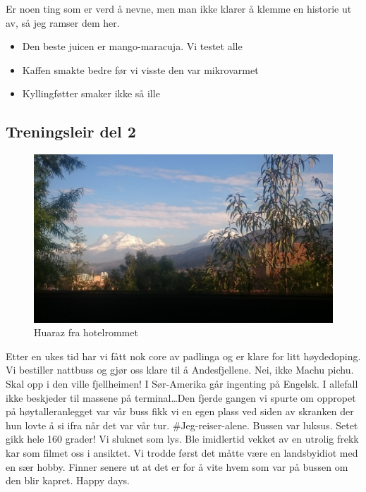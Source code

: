 Er noen ting som er verd å nevne, men man ikke klarer å klemme en
historie ut av, så jeg ramser dem her.

\begin{itemize}
	\item Den beste juicen er mango-maracuja. Vi testet
			alle
		\item Kaffen smakte bedre før vi visste den var
			mikrovarmet
		\item Kyllingføtter smaker ikke så ille
\end{itemize}


\subsection{Treningsleir del 2}

\begin{figure}[!h]
	\centering
	\includegraphics[width=\textwidth]{Hotellromhuaraz}
	\caption*{Huaraz fra hotelrommet}	
\label{fig:huaraz}
\end{figure}
Etter en ukes tid har vi fått nok core av padlinga og er klare for
litt høydedoping. Vi bestiller nattbuss og gjør oss klare til å
Andesfjellene. Nei, ikke Machu pichu. Skal opp i den ville
fjellheimen! I Sør-Amerika går ingenting på Engelsk. I allefall ikke
beskjeder til massene på terminal\ldots Den fjerde
gangen vi spurte om oppropet på høytalleranlegget var vår buss fikk vi
en egen plass ved siden av skranken der hun lovte å si ifra når det var vår
tur. \#Jeg-reiser-alene. Bussen var luksus. Setet gikk hele 160 grader!
Vi sluknet som lys. Ble imidlertid vekket av en utrolig frekk kar som
filmet oss i ansiktet. Vi trodde først det måtte være en landsbyidiot
med en sær hobby. Finner senere ut at det er for å vite hvem som var
på bussen om den blir kapret. Happy days. 


